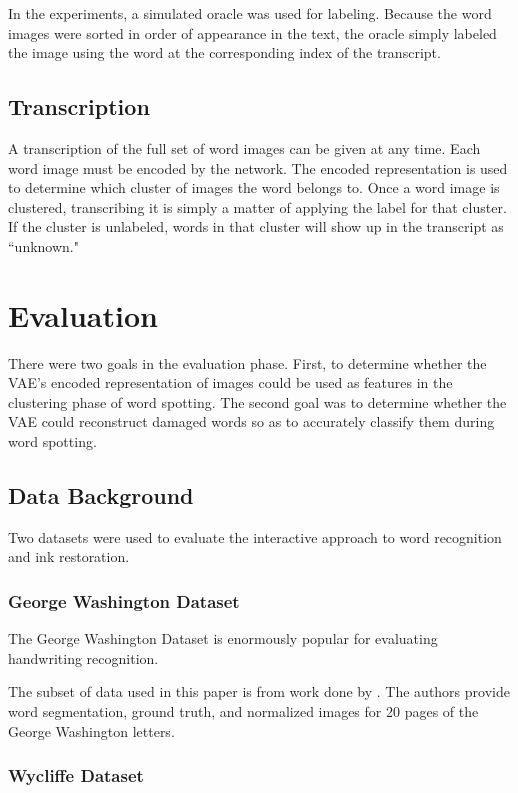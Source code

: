 \documentclass[final]{ukthesis}
\begin{document}
In the experiments, a simulated oracle was used for labeling. Because the word images were sorted in order of appearance in the text, the oracle simply labeled the image using the word at the corresponding index of the transcript.


\section{Transcription}
A transcription of the full set of word images can be given at any time. Each word image must be encoded by the network. The encoded representation is used to determine which cluster of images the word belongs to. Once a word image is clustered, transcribing it is simply a matter of applying the label for that cluster. If the cluster is unlabeled, words in that cluster will show up in the transcript as ``unknown." 




%
%
%
\chapter{Evaluation}
There were two goals in the evaluation phase. First, to determine whether the VAE's encoded representation of images could be used as features in the clustering phase of word spotting. The second goal was to determine whether the VAE could reconstruct damaged words so as to accurately classify them during word spotting.


%
%
\section{Data Background}
Two datasets were used to evaluate the interactive approach to word recognition and ink restoration.

\subsection{George Washington Dataset}
The George Washington Dataset is enormously popular for evaluating handwriting recognition.

The subset of data used in this paper is from work done by \cite{fischer2012lexicon}. The authors provide word segmentation, ground truth, and normalized images for 20 pages of the George Washington letters.

\subsection{Wycliffe Dataset}
\end{document}
